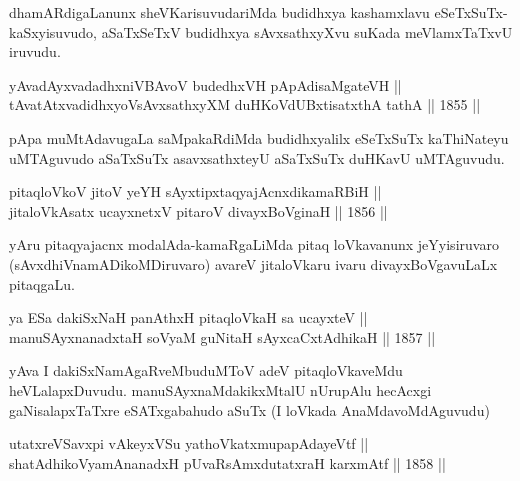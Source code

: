 \begin{artha}
dhamARdigaLanunx sheVKarisuvudariMda budidhxya kashamxlavu
eSeTxSuTx-kaSxyisuvudo, aSaTxSeTxV budidhxya sAvxsathxyXvu suKada
meVlamxTaTxvU iruvudu.
\end{artha}

\begin{shl}
yAvadAyxvadadhxniVBAvoV budedhxVH pApAdisaMgateVH || \\
tAvatAtxvadidhxyoV\s sAvxsathxyXM duHKoVdUBxtisatxthA tathA \hfill || 1855 ||  
\end{shl}

\begin{artha}
pApa muMtAdavugaLa saMpakaRdiMda budidhxyalilx eSeTxSuTx kaThiNateyu
uMTAguvudo aSaTxSuTx asavxsathxteyU aSaTxSuTx duHKavU uMTAguvudu.
\end{artha}


\begin{shl}
pitaqloVkoV jitoV yeYH sAyxtipxtaqyajAcnxdikamaRBiH || \\
jitaloVkAsatx ucayxnetxV pitaroV divayxBoVginaH \hfill || 1856 ||  
\end{shl}

\begin{artha}
yAru pitaqyajacnx modalAda-kamaRgaLiMda pitaq loVkavanunx
jeYyisiruvaro (sAvxdhiVnamADikoMDiruvaro) avareV jitaloVkaru ivaru
divayxBoVgavuLaLx pitaqgaLu.
\end{artha}


\begin{shl}
ya ESa dakiSxNaH panAthxH pitaqloVkaH sa ucayxteV ||  \\
manuSAyxnanadxtaH soV\s yaM guNitaH sAyxcaCxtAdhikaH \hfill || 1857 ||  
\end{shl}

\begin{artha}
yAva I dakiSxNamAgaRveMbuduMToV adeV pitaqloVkaveMdu heVLalapxDuvudu. manuSAyxnaMdakikxMtalU nUrupAlu hecAcxgi gaNisalapxTaTxre eSATxgabahudo aSuTx (I loVkada AnaMdavoMdAguvudu)
\end{artha}


\begin{shl}
utatxreVSavxpi vAkeyxVSu yathoVkatxmupapAdayeVtf || \\
shatAdhikoV\s yamAnanadxH pUvaRsAmxdutatxraH karxmAtf \hfill || 1858 ||  
\end{shl}

